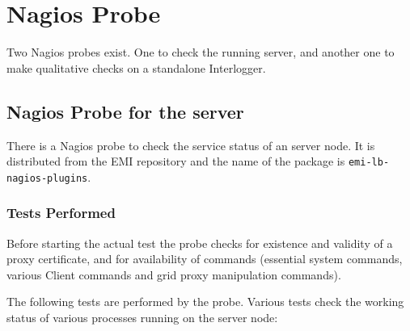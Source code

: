 %
%

\section{Nagios Probe}
\label{s:nagios}

Two Nagios probes exist. One to check the running \LB server, and another one to make qualitative checks on a standalone \LB Interlogger.

\subsection{Nagios Probe for the \LB server}

There is a Nagios probe to check the service status of an \LB server node. It is distributed from the EMI repository and the name of the package is \texttt{emi-lb-nagios-plugins}. 

\subsubsection{Tests Performed}
Before starting the actual test the probe checks for existence and validity of a proxy certificate, and for availability of commands (essential system commands, various \LB Client commands and grid proxy manipulation commands).

The following tests are performed by the probe. Various tests check the working status of various processes running on the \LB server node:

